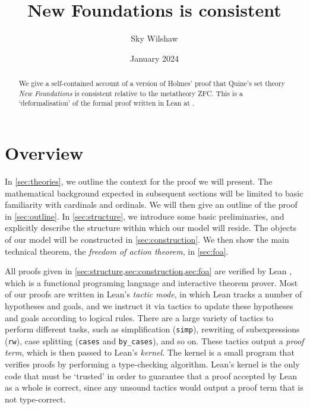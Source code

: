 \documentclass{article}
\title{New Foundations is consistent}
\author{Sky Wilshaw}
\date{January 2024}
\theoremstyle{definition}
\theoremstyle{remark}
\begin{document}
\maketitle

\begin{abstract}
	We give a self-contained account of a version of Holmes' proof \cite{holmes2023nf} that Quine's set theory \emph{New Foundations} \cite{quine-nf} is consistent relative to the metatheory ZFC.
	This is a `deformalisation' of the formal proof written in Lean at \cite{leanprover-community-con-nf}.
\end{abstract}

\tableofcontents

\section{Overview}


In \cref{sec:theories}, we outline the context for the proof we will present.
The mathematical background expected in subsequent sections will be limited to basic familiarity with cardinals and ordinals.
We will then give an outline of the proof in \cref{sec:outline}.
In \cref{sec:structure}, we introduce some basic preliminaries, and explicitly describe the structure within which our model will reside.
The objects of our model will be constructed in \cref{sec:construction}.
We then show the main technical theorem, the \emph{freedom of action theorem}, in \cref{sec:foa}.

All proofs given in \cref{sec:structure,sec:construction,sec:foa} are verified by Lean \cite{lean}, which is a functional programing language and interactive theorem prover.
Most of our proofs are written in Lean's \emph{tactic mode}, in which Lean tracks a number of hypotheses and goals, and we instruct it via tactics to update these hypotheses and goals according to logical rules.
There are a large variety of tactics to perform different tasks, such as simplification (\texttt{simp}), rewriting of subexpressions (\texttt{rw}), case splitting (\texttt{cases} and \texttt{by\_cases}), and so on.
These tactics output a \emph{proof term}, which is then passed to Lean's \emph{kernel}.
The kernel is a small program that verifies proofs by performing a type-checking algorithm.
Lean's kernel is the only code that must be `trusted' in order to guarantee that a proof accepted by Lean as a whole is correct, since any unsound tactics would output a proof term that is not type-correct.
\end{document}
